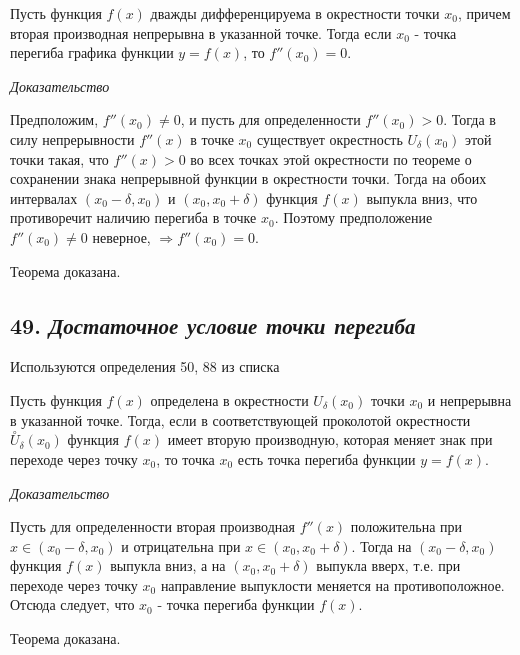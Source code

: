 Пусть функция $f(x)$ дважды дифференцируема в окрестности точки $x_0$, причем вторая производная непрерывна в указанной точке. Тогда если $x_0$ - точка перегиба графика функции $y = f(x)$, то $f''(x_0) = 0.$
\vspace*{20pt} 

\textit{Доказательство}

Предположим, $f''(x_0) \neq 0$, и пусть для определенности $f''(x_0) > 0$. Тогда в силу непрерывности $f
''(x)$ в точке $x_0$ существует окрестность $U_\delta(x_0)$ этой точки такая, что $f
''(x) > 0$ во всех точках этой окрестности по теореме о сохранении знака непрерывной функции в окрестности точки. Тогда на обоих интервалах $(x_0 - \delta, x_0)$ и $(x_0, x_0 + \delta)$ функция $f(x)$ выпукла вниз, что противоречит наличию перегиба в точке $x_0$. Поэтому предположение $f''(x_0) \neq 0$ неверное, $\Rightarrow f''(x_0) = 0$.

Теорема доказана.
\newpage 
\subsection*{49. \textit{Достаточное условие точки перегиба}}
\begin{Quote2} 
\small\centering 

Используются определения 50, 88 из списка \end{Quote2} 

Пусть функция $f(x)$ определена в окрестности $U_\delta(x_0)$ точки $x_0$ и непрерывна в указанной точке. Тогда, если в соответствующей проколотой окрестности $\overset{\circ}U_\delta(x_0)$ функция $f(x)$ имеет вторую производную, которая меняет знак при переходе через точку $x_0$, то точка $x_0$ есть точка перегиба функции $y = f(x)$.
\vspace*{20pt} 

\textit{Доказательство}

Пусть для определенности вторая производная $f
''(x)$ положительна при $x \in (x_0 - \delta, x_0)$ и отрицательна при $x \in (x_0, x_0 + \delta)$. Тогда на $(x_0 -\delta, x_0)$ функция $f(x)$ выпукла вниз, а на $(x_0, x_0 + \delta)$ выпукла вверх, т.е. при переходе через точку $x_0$ направление выпуклости меняется на противоположное. Отсюда следует, что $x_0$ - точка перегиба функции $f(x)$.

Теорема доказана.
\newpage\let\clearpage\relax 


    